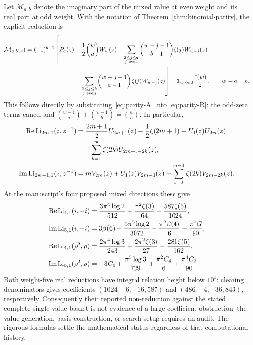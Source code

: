 Let $\mathcal M_{a,b}$ denote the imaginary part of the mixed value at even
weight and its real part at odd weight. With the notation of
Theorem~\ref{thm:binomial-parity}, the explicit reduction is
\begin{align}\label{eq:mixed-parity-explicit}
 \mathcal M_{a,b}(z)
 ={}&(-1)^{b+1}\left[
 P_a(z)+\frac12\binom{w}{a}W_w(z)
 -\sum_{\substack{2\le j\le a\\j\text{ even}}}
     \binom{w-j-1}{b-1}\zeta(j)W_{w-j}(z)\right.\notag\\
 &\left.\hspace{24mm}
 -\sum_{\substack{2\le j\le b\\j\text{ even}}}
     \binom{w-j-1}{a-1}\zeta(j)W_{w-j}(z)\right]
 -\boldsymbol{1}_{w\text{ odd}}\frac{\zeta(w)}2,
 \qquad w=a+b.
\end{align}
This follows directly by substituting~\eqref{eq:parity-A} into
\eqref{eq:parity-R}: the odd-zeta terms cancel and
$\binom{w-1}{a}+\binom{w-1}{b}=\binom{w}{a}$.
In particular,
\begin{align*}
 \operatorname{Re}\operatorname{Li}_{2m,1}(z,z^{-1})
 &=\frac{2m+1}{2}U_{2m+1}(z)-\frac12\zeta(2m+1)
    +U_1(z)U_{2m}(z)\\
 &\quad-\sum_{k=1}^{m}\zeta(2k)U_{2m+1-2k}(z),\\
 \operatorname{Im}\operatorname{Li}_{2m-1,1}(z,z^{-1})
 &=mV_{2m}(z)+U_1(z)V_{2m-1}(z)
    -\sum_{k=1}^{m-1}\zeta(2k)V_{2m-2k}(z).
\end{align*}
At the manuscript's four proposed mixed directions these give
\begin{align*}
 \operatorname{Re}\operatorname{Li}_{4,1}(i,-i)
 &=\frac{3\pi^4\log2}{512}+\frac{\pi^2\zeta(3)}{64}
                               -\frac{587\zeta(5)}{1024},\\
 \operatorname{Im}\operatorname{Li}_{5,1}(i,-i)
 &=3\beta(6)-\frac{5\pi^5\log2}{3072}
             -\frac{\pi^2\beta(4)}6-\frac{\pi^4G}{90},\\
 \operatorname{Re}\operatorname{Li}_{4,1}(\rho^2,\rho)
 &=\frac{2\pi^4\log3}{243}+\frac{2\pi^2\zeta(3)}{27}
                               -\frac{281\zeta(5)}{162},\\
 \operatorname{Im}\operatorname{Li}_{5,1}(\rho^2,\rho)
 &=-3C_6+\frac{\pi^5\log3}{729}
             +\frac{\pi^2C_4}{6}+\frac{\pi^4C_2}{90}.
\end{align*}
Both weight-five real reductions have integral relation height below
$10^4$: clearing denominators gives coefficients
$(1024,-6,-16,587)$ and $(486,-4,-36,843)$, respectively.
Consequently their reported non-reduction against the stated complete
single-value basket is not evidence of a large-coefficient obstruction;
the value generation, basis construction, or search setup requires an
audit. The rigorous formulas settle the mathematical status regardless
of that computational history.

